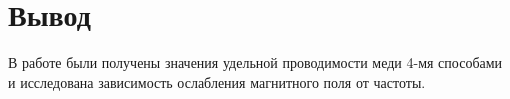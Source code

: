 \section{Вывод}
В работе были получены значения удельной проводимости меди 4-мя способами
и исследована зависимость ослабления магнитного поля от частоты.
